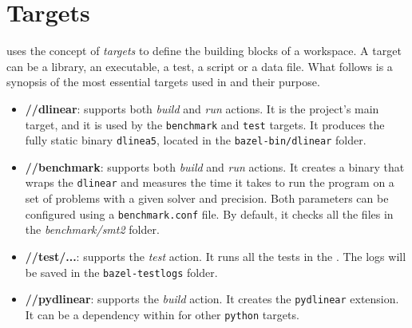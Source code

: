 

\section{Targets}

\bazel uses the concept of \textit{targets} to define the building blocks of a workspace.
A target can be a library, an executable, a test, a script or a data file.
What follows is a synopsis of the most essential targets used in \dlinear and their purpose.

\begin{itemize}
        \item \textbf{//dlinear}: supports both \textit{build} and \textit{run} actions.
              It is the project's main target, and it is used by the \texttt{benchmark} and \texttt{test} targets.
              It produces the fully static binary \texttt{dlinea5}, located in the \texttt{bazel-bin/dlinear} folder.
        \item \textbf{//benchmark}: supports both \textit{build} and \textit{run} actions.
              It creates a binary that wraps the \texttt{dlinear} and measures the time it takes to run the program on a set of problems with a given solver and precision.
              Both parameters can be configured using a \texttt{benchmark.conf} file.
              By default, it checks all the files in the \textit{benchmark/smt2} folder.
        \item \textbf{//test/...}: supports the \textit{test} action.
              It runs all the tests in the \dlinear.
              The logs will be saved in the \texttt{bazel-testlogs} folder.
        \item \textbf{//pydlinear}: supports the \textit{build} action.
              It creates the \texttt{pydlinear} extension.
              It can be a dependency within \bazel for other \texttt{python} targets.
\end{itemize}
